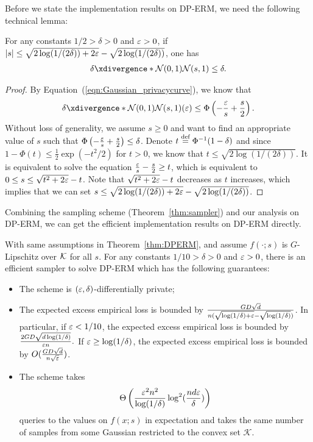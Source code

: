 Before we state the implementation results on DP-ERM, we need the following technical lemma:
\begin{lemma}
\label{lm:privacy_curve_bound}
For any constants $1/2>\delta>0$ and $\varepsilon>0$, if $|s|\leq \sqrt{2\log(1/(2\delta))+2\varepsilon}-\sqrt{2\log(1/(2\delta))}$,
one has
\begin{align*}
  \deltacurve{\cN(0,1)}{\cN(s,1)}\leq \delta.  
\end{align*}
\end{lemma}
\begin{proof}
By Equation~(\ref{eqn:Gaussian_privacycurve}), we know that
\begin{align*}
    \deltacurve{\cN(0,1)}{\cN(s,1)}(\eps)\leq \Phi\lp -\frac{\eps}{s}+\frac{s}{2} \rp.
\end{align*}
Without loss of generality, we assume $s\geq0$ and
want to find an appropriate value of $s$ such that $\Phi\left( -\frac{\varepsilon}{s}+\frac{s}{2} \right)\leq \delta$. 
Denote $t\stackrel{{\text{def}}}{=} \Phi^{-1}(1-\delta)$ and since $1-\Phi(t)\le \frac{1}{2}\exp(-t^2/2)$ for $t>0$, we know that $t\leq \sqrt{2\log(1/(2\delta))}$.
It is equivalent to solve the equation $\frac{\varepsilon}{s}-\frac{s}{2}\geq t$, which is equivalent to $0\leq s\leq \sqrt{t^2+2\varepsilon}-t$.
Note that $\sqrt{t^2+2\varepsilon}-t$ decreases as $t$ increases, which implies that we can set $s\leq \sqrt{2\log(1/(2\delta))+2\varepsilon}-\sqrt{2\log(1/(2\delta))}$.
\end{proof}

Combining the sampling scheme (Theorem~\ref{thm:sampler}) and our analysis on DP-ERM, we can get the efficient implementation results on DP-ERM directly.

 

\begin{theorem}
\label{thm:DPERM_impl}
With same assumptions in Theorem~\ref{thm:DPERM}, and assume $f(\cdot;s)$ is $G$-Lipschitz over $\mathcal K$ for all $s$.
For any constants $1/10> \delta>0$ and $ \varepsilon> 0$, there is an efficient sampler to solve DP-ERM which has the following guarantees:
\begin{itemize}
    \item The scheme is $(\varepsilon,\delta)$-differentially private;
    \item The expected excess empirical loss is bounded by $\frac{GD\sqrt{d}}{n(\sqrt{\log(1/\delta)+\varepsilon}-\sqrt{\log(1/\delta)})}$.
    In particular, if $\varepsilon< 1/10$, the expected excess empirical loss is bounded by
    $
        \frac{2GD\sqrt{d\log(1/\delta)}}{\varepsilon n}.
    $
    If $\varepsilon \geq \log(1/\delta)$, the expected excess empirical loss is bounded by $ O(\frac{GD\sqrt{d}}{n\sqrt{\varepsilon}})$.
    \item The scheme takes 
    \begin{align*}
        \Theta\left(\frac{\varepsilon^2n^2}{\log(1/\delta)}\log^2(\frac{nd\varepsilon}{\delta})\right)
    \end{align*}
    queries to the values on $f(x;s)$ in expectation and takes the same number of samples from some Gaussian restricted to the convex set $\mathcal{K}$.
\end{itemize}
\end{theorem}

